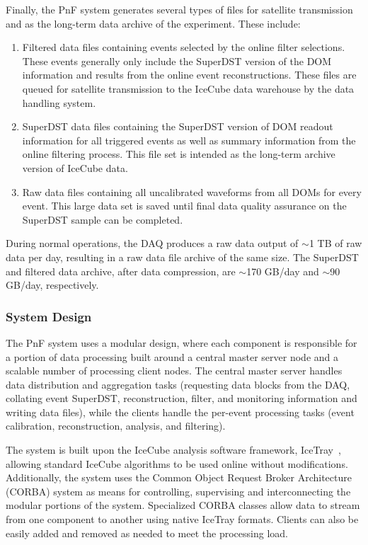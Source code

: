 Finally, the PnF system generates several types of files for satellite
transmission and as the long-term data archive of the experiment. These
include:   
\begin{enumerate}
\item Filtered data files containing events selected by the online filter
  selections.  These events generally only include the SuperDST version of
  the DOM information and results from the online event reconstructions.
  These files are queued for satellite transmission to the IceCube data
  warehouse by the data handling system.
\item SuperDST data files containing the SuperDST version of DOM readout
  information for all triggered events as well as summary information from
  the online filtering process.  This file set is intended as the long-term
  archive version of IceCube data.
\item Raw data files containing all uncalibrated waveforms from all DOMs for
  every event.  This large data set is saved until final data quality
  assurance on the SuperDST sample can be completed.
\end{enumerate}

During normal operations, the DAQ produces a raw data output of $\sim$1 TB
of raw data per day, resulting in a raw data file 
archive of the same size.  The SuperDST and filtered data archive, after
data compression, are $\sim$170 GB/day and $\sim$90 GB/day, respectively.

\subsubsection{System Design}

The PnF system uses a modular design, where
each component is responsible for a portion of data processing built around
a central master server node and a scalable number of processing client
nodes.  The central master server handles data distribution and
aggregation tasks (requesting data blocks from the DAQ, collating event
SuperDST, reconstruction, filter, and monitoring information and writing
data files), while the clients handle the per-event processing
tasks (event calibration, reconstruction, analysis, and filtering).

The system is built upon the IceCube analysis software framework,
IceTray~\cite{DeYoung:2005zz}, allowing standard IceCube algorithms to be
used online without modifications.
Additionally, the system uses the Common Object Request Broker Architecture
(CORBA) system as means for controlling, supervising and interconnecting
the modular portions of the system.  Specialized CORBA classes allow
data to stream from one component to another using native IceTray formats.
Clients can also be easily added and removed as needed to meet the
processing load.

